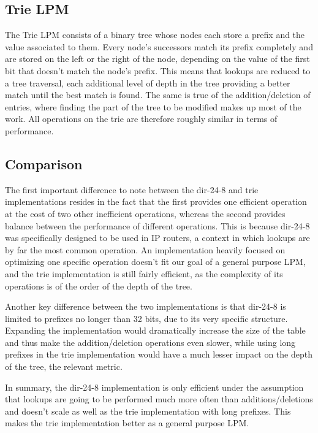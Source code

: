 \documentclass{article}
\begin{document}
\subsection{Trie LPM}
The Trie LPM consists of a binary tree whose nodes each store a prefix and the value
associated to them. Every node's successors match its prefix completely and are
stored on the left or the right of the node, depending on the value of the first bit
that doesn't match the node's prefix. This means that lookups are reduced to a tree
traversal, each additional level of depth in the tree providing a better match until
the best match is found. The same is true of the addition/deletion of entries, where
finding the part of the tree to be modified makes up most of the work. All operations
on the trie are therefore roughly similar in terms of performance.
\subsection{Comparison}
The first important difference to note between the dir-24-8 and trie implementations
resides in the fact that the first provides one efficient operation at the cost of
two other inefficient operations, whereas the second provides balance between the
performance of different operations. This is because dir-24-8 was specifically
designed to be used in IP routers, a context in which lookups are by far the most
common operation. An implementation heavily focused on optimizing one specific
operation doesn't fit our goal of a general purpose LPM, and the trie implementation
is still fairly efficient, as the complexity of its operations is of the order of
the depth of the tree. \par
Another key difference between the two implementations is that dir-24-8 is limited
to prefixes no longer than 32 bits, due to its very specific structure. Expanding
the implementation would dramatically increase the size of the table and thus make
the addition/deletion operations even slower, while using long prefixes in the trie
implementation would have a much lesser impact on the depth of the tree, the relevant metric. \par
In summary, the dir-24-8 implementation is only efficient under the assumption that
lookups are going to be performed much more often than additions/deletions and doesn't
scale as well as the trie implementation with long prefixes. This makes the trie
implementation better as a general purpose LPM.
\end{document}
